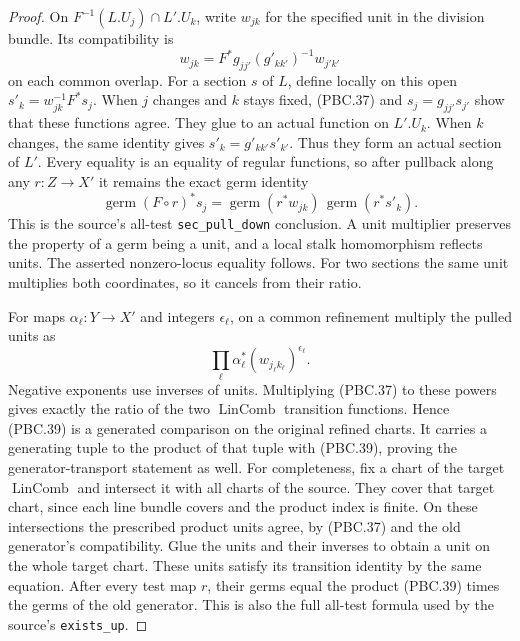 \documentclass[11pt,a4paper]{article}
\numberwithin{equation}{section}
\theoremstyle{remark}\newtheorem{remark}[theorem]{Remark}
\begin{document}
\begin{proof}
On $F^{-1}(L.U_j)\cap L'.U_k$, write $w_{jk}$ for the
specified unit in the division bundle.  Its compatibility is
\[
 w_{jk}=F^*g_{jj'}(g'_{kk'})^{-1}w_{j'k'}
                                                        \tag{PBC.37}
\]
on each common overlap.  For a section $s$ of $L$, define
locally on this open
$s'_k=w_{jk}^{-1}F^*s_j$.
When $j$ changes and $k$ stays fixed, (PBC.37) and
$s_j=g_{jj'}s_{j'}$ show that these functions agree.
They glue to an actual function on $L'.U_k$.
When $k$ changes, the same identity gives
$s'_k=g'_{kk'}s'_{k'}$.
Thus they form an actual section of $L'$.
Every equality is an equality of regular functions, so after
pullback along any $r:Z\to X'$ it remains the exact germ
identity
\[
 \operatorname{germ}(F\circ r)^*s_j
    =\operatorname{germ}(r^*w_{jk})\,
                      \operatorname{germ}(r^*s'_k).
                                                        \tag{PBC.38}
\]
This is the source's all-test \texttt{sec\_\allowbreak pull\_\allowbreak down}
conclusion.  A unit multiplier preserves the property of a
germ being a unit, and a local stalk homomorphism reflects
units.  The asserted nonzero-locus equality follows.
For two sections the same unit multiplies both coordinates,
so it cancels from their ratio.

For maps $\alpha_\ell:Y\to X'$ and integers $\epsilon_\ell$,
on a common refinement multiply the pulled units as
\[
 \prod_\ell \alpha_\ell^*(w_{j_\ell k_\ell})^{\epsilon_\ell}.
                                                        \tag{PBC.39}
\]
Negative exponents use inverses of units.
Multiplying (PBC.37) to these powers gives exactly the ratio
of the two $\operatorname{LinComb}$ transition functions.
Hence (PBC.39) is a generated comparison on the original
refined charts.  It carries a generating tuple to the
product of that tuple with (PBC.39), proving the
generator-transport statement as well.
For completeness, fix a chart of the target
$\operatorname{LinComb}$ and intersect it with all charts
of the source.  They cover that target chart, since each
line bundle covers and the product index is finite.
On these intersections the prescribed product units agree,
by (PBC.37) and the old generator's compatibility.
Glue the units and their inverses to obtain a unit on the
whole target chart.  These units satisfy its transition
identity by the same equation.  After every test map $r$,
their germs equal the product (PBC.39) times the germs of
the old generator.  This is also the full all-test formula
used by the source's \texttt{exists\_\allowbreak up}.


\end{proof}
\end{document}

